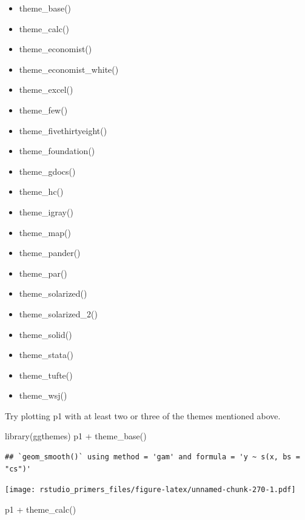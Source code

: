 \documentclass[
]{article}
\newenvironment{Shaded}{\begin{snugshade}}{\end{snugshade}}
\newcommand{\FunctionTok}[1]{\textcolor[rgb]{0.00,0.00,0.00}{#1}}
\newcommand{\NormalTok}[1]{#1}
\newcommand{\SpecialCharTok}[1]{\textcolor[rgb]{0.00,0.00,0.00}{#1}}
\providecommand{\tightlist}{%
  \setlength{\itemsep}{0pt}\setlength{\parskip}{0pt}}
\begin{document}
\begin{itemize}
\tightlist
\item
  theme\_base()
\item
  theme\_calc()
\item
  theme\_economist()
\item
  theme\_economist\_white()
\item
  theme\_excel()
\item
  theme\_few()
\item
  theme\_fivethirtyeight()
\item
  theme\_foundation()
\item
  theme\_gdocs()
\item
  theme\_hc()
\item
  theme\_igray()
\item
  theme\_map()
\item
  theme\_pander()
\item
  theme\_par()
\item
  theme\_solarized()
\item
  theme\_solarized\_2()
\item
  theme\_solid()
\item
  theme\_stata()
\item
  theme\_tufte()
\item
  theme\_wsj()
\end{itemize}

Try plotting p1 with at least two or three of the themes mentioned
above.

\begin{Shaded}
\begin{Highlighting}[]
\FunctionTok{library}\NormalTok{(ggthemes)}
\NormalTok{p1 }\SpecialCharTok{+} \FunctionTok{theme\_base}\NormalTok{()}
\end{Highlighting}
\end{Shaded}

\begin{verbatim}
## `geom_smooth()` using method = 'gam' and formula = 'y ~ s(x, bs = "cs")'
\end{verbatim}

\texttt{[image: rstudio\_primers\_files/figure-latex/unnamed-chunk-270-1.pdf]}

\begin{Shaded}
\begin{Highlighting}[]
\NormalTok{p1 }\SpecialCharTok{+} \FunctionTok{theme\_calc}\NormalTok{()}
\end{Highlighting}
\end{Shaded}
\end{document}
